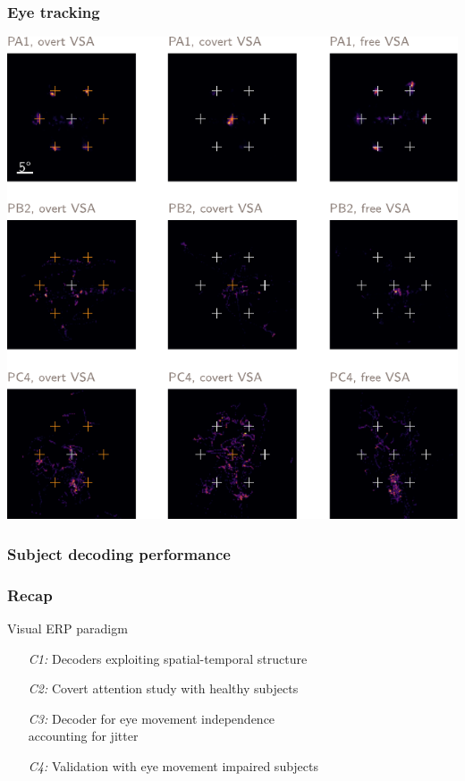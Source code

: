 \documentclass{kul-ulille-beamer}
\begin{document}
\begin{frame}[c]
  \frametitle{Eye tracking}
  \begin{minipage}{.6\textwidth}
    \centering
    \includegraphics[width=.8\textwidth]{figures/patients/fig_gaze.pdf}
  \end{minipage}
\end{frame}

\begin{frame}
  \frametitle{Subject decoding performance}
  \begin{minipage}{.6\textwidth}
    \resizebox{\textwidth}{!}{
      
    }
  \end{minipage}
\end{frame}

\begin{frame}
  \frametitle{Recap}
  Visual ERP paradigm
  \begin{itemize}
    \bigskip
  \item[\emph{C1:}] Decoders exploiting spatial-temporal structure
    \bigskip
  \item[\emph{C2:}] Covert attention study with healthy subjects
    \bigskip
  \item[\emph{C3:}] Decoder for eye movement independence \\ accounting for jitter
    \bigskip
  \item[\emph{C4:}] Validation with eye movement impaired subjects
  \end{itemize}
\end{frame}
\end{document}
